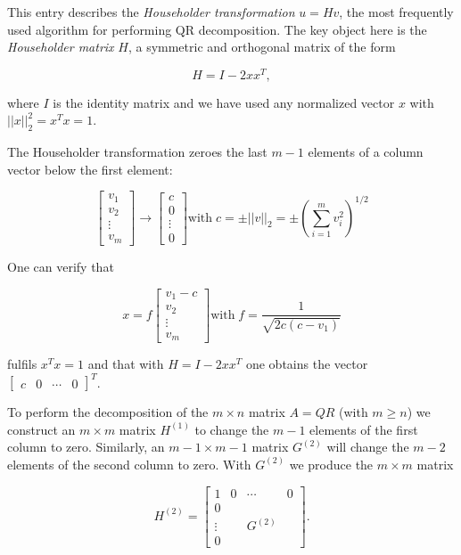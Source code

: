 \documentclass[12pt]{article}
\begin{document}
This entry describes the \emph{Householder transformation} $u=Hv$, the most frequently used algorithm for performing QR decomposition.  The key object here is the \emph{Householder matrix} $H$, a symmetric and orthogonal matrix of the form

$$ H = I - 2xx^T, $$

where $I$ is the identity matrix and we have used any normalized vector $x$ with $||x||_2^2 = x^Tx = 1$.

The Householder transformation zeroes the last $m-1$ elements of a column vector below the first element:

$$ \begin{bmatrix}v_1 \\ v_2 \\ \vdots \\ v_m \end{bmatrix} \rightarrow \begin{bmatrix}c \\ 0 \\ \vdots \\ 0 \end{bmatrix} \text{with}\; c = \pm ||v||_2 = \pm \left(\sum_{i=1}^m v_i^2\right)^{1/2} $$

One can verify that

$$ x = f \begin{bmatrix}v_1 - c \\ v_2 \\ \vdots \\ v_m \end{bmatrix} \text{with}\; f=\frac{1}{\sqrt{2c(c-v_1)}} $$

fulfils $x^Tx=1$ and that with $H=I-2xx^T$ one obtains the vector $\begin{bmatrix}c & 0 & \cdots & 0 \end{bmatrix}^T$.

To perform the decomposition of the $m \times n$ matrix $A = QR$ (with $m \ge n$) we construct an $m \times m$ matrix $H^{(1)}$ to change the $m-1$ elements of the first column to zero.  Similarly, an $m-1 \times m-1$ matrix $G^{(2)}$ will change the $m-2$ elements of the second column to zero. With $G^{(2)}$ we produce the $m \times m$ matrix

$$ H^{(2)} = \begin{bmatrix}1 & 0 & \cdots & 0 \\ 0 & \; & \; & \; \\ \vdots & \; & G^{(2)} & \; \\ 0 & \; & \; & \; \end{bmatrix}.$$
\end{document}

